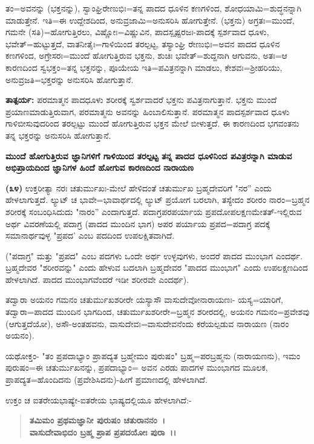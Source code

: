 ತಂ=ಅವನನ್ನು (ಭಕ್ತನನ್ನು), ಸ್ವಾಂಘ್ರಿರೇಣುಭಿಃ=ತನ್ನ ಪಾದದ ಧೂಳಿನ ಕಣಗಳಿಂದ, ಶೋಧಯಾಮಿ=ಶುದ್ಧನನ್ನಾಗಿ ಮಾಡುತ್ತೇನೆ. ಇತಿ=ಈ ಉದ್ದೇಶದಿಂದ, ಅನು\-ವ್ರಜಾಮಿ=\break ಅನುಸರಿಸಿ ಹೋಗುತ್ತೇನೆ. (ಭಕ್ತನು) ಅಗ್ರತಃ=ಮುಂದೆ, ಗಮನೇ (ಸತಿ)=ಹೋಗುತ್ತಿರಲು, ವಿಷ್ಣೋಃ=ವಿಷ್ಣುವಿನ, ಪಾದಸ್ಪೃಷ್ಟರಜಃ-ಪಾದಕ್ಕೆ ಸ್ಪರ್ಶವಾದ ಧೂಳು, ಭವೇತ್=ಹುಟ್ಟುತ್ತದೆ, ವಾತನೀತೈಃ=ಗಾಳಿಯಿಂದ ತರಲ್ಪಟ್ಟ, ತಸ್ಯಾಂಘ್ರಿ ರೇಣುಭಿಃ=ಅವನ ಪಾದದ ಧೂಳಿನ ಕಣಗಳಿಂದ, ಅಗ್ರೇಸರಃ=ಮುಂದೆ ಹೋಗುತ್ತಿರುವ ಭಕ್ತನು, ಶುಚಿಃ ಭವೇತ್=ಶುದ್ದನಾಗಿ ಆಗುವನು, ಅತಃ=ಆ ಕಾರಣದಿಂದ ಸ್ವಭಕ್ತಂ=ತನ್ನ ಭಕ್ತನನ್ನು, ಪೂಯೇಯ ಇತಿ=ಪವಿತ್ರನನ್ನಾಗಿ ಮಾಡಲು, ಕೇಶವಃ=ಶ‍್ರೀಹರಿಯು, ಅನುವ್ರಜತಿ=ಭಕ್ತರನ್ನು ಅನುಸರಿಸಿ ಹೋಗುತ್ತಾನೆ.

\textbf{ತಾತ್ಪರ್ಯ:} ಪರಮಾತ್ಮನ ಪಾದಧೂಳು ಶರೀರಕ್ಕೆ ಸ್ವರ್ಶವಾದರೆ ಭಕ್ತನು ಪವಿತ್ರನಾಗುತ್ತಾನೆ. ಭಕ್ತನು ಮುಂದೆ ಪ್ರಯಾಣಮಾಡುತ್ತಿರುವಾಗ, ಪರಮಾತ್ಮನು ಅವನನ್ನು ಹಿಂಬಾಲಿಸುತ್ತಾನೆ. ಪರಮಾತ್ಮನ ಪಾದಸ್ಪರ್ಶವಾದ ಧೂಳು ಗಾಳಿಬೀಸುವುದರಿಂದ ತರಲ್ಪಟ್ಟು ಮುಂದೆ ಹೋಗುತ್ತಿರುವ ಭಕ್ತನ ಮೇಲೆ ಬೀಳುತ್ತದೆ. ಈ ಕಾರಣದಿಂದ ಭಗವಂತನು ತನ್ನ ಭಕ್ತರನ್ನು ಅನುಸರಿಸಿ ಹೋಗುತ್ತಾನೆ.

\begin{center}
\textbf{ಮುಂದೆ ಹೋಗುತ್ತಿರುವ ಜ್ಞಾನಿಗಳಿಗೆ ಗಾಳಿಯಿಂದ ತರಲ್ಪಟ್ಟ ತನ್ನ ಪಾದದ ಧೂಳಿನಿಂದ ಪವಿತ್ರರನ್ನಾಗಿ ಮಾಡುವ ಅಭಿಪ್ರಾಯದಿಂದ ಜ್ಞಾನಿಗಳ ಹಿಂದೆ ಹೋಗುವ ಕಾರಣದಿಂದ ನಾರಾಯಣ}
\end{center}

\textbf{(೩೪)} ಉಕ್ತರೀತ್ಯಾ ನರಃ ಚತುರ್ಮುಖಃ-ಮೇಲೆ ಹೇಳಿದಂತೆ ಚತುರ್ಮುಖ ಬ್ರಹ್ಮದೇವರಿಗೆ "ನರ'' ಎಂದು ಹೇಳಲಾಗುತ್ತದೆ. ಲ್ಯುಟ್ ಚ ಭಾವೇ=ಭಾವಾರ್ಥದಲ್ಲಿ ಲ್ಯುಟ್ ಪ್ರಯೋಗ ಬರಲಾಗಿ, ತಸ್ಯೇದಂ ಶರೀರಂ ನಾರಂ=ಬ್ರಹ್ಮನ ಶರೀರಕ್ಕೆ ಸಂಬಂಧಿಸಿದುದು "ನಾರಂ'' ಎಂದಾಗುತ್ತದೆ. ಪದಾಗ್ರಪರಪರ್ಯಾಯ ಪ್ರಪದೋಪಲಕ್ಷಣಮೇತತ್-ಇಲ್ಲಿರುವ ಅರ್ಥ ವಿವರಣೆಯಲ್ಲಿ ಪದಾಗ್ರ (ಪಾದದ ಮುಂದಿನ ಭಾಗ) ಅಪರ ಪರ್ಯಾಯ ಪ್ರಪದ=ಪದಾಗ್ರ ಪದಕ್ಕೆ ಸಮಾನಾರ್ಥವುಳ್ಳ "ಪ್ರಪದ' ಎಂಬ ಪದದಿಂದ ಉಪಲಕ್ಷಿತವಾಗಿದೆ.

("ಪದಾಗ್ರ" ಮತ್ತು "ಪ್ರಪದ" ಎಂಬ ಪದಗಳು ಒಂದೇ ಅರ್ಥ ಉಳ್ಳವುಗಳು, ಅಂದರೆ ಪಾದದ ಮುಂಭಾಗ ಎಂದರ್ಥ. ಬ್ರಹ್ಮದೇವರ "ಶರೀರವನ್ನು" ಎಂದು ಹೇಳುವ ಬದಲಾಗಿ ಬ್ರಹ್ಮದೇವರ "ಪಾದದ ಮುಂಭಾಗ" ಎಂದು ಉಪಲಕ್ಷಣದಿಂದ ಹೇಳಲಾಗಿದೆ. ಪಾದದ ಮುಂಭಾಗವೆಂದರೆ ಇಡೀ ಶರೀರವೇ ಎಂದರ್ಥ).

ತದ್ವಾರಾ ಅಯನಂ ಗಮನಂ ಚತುರ್ಮುಖಶರೀರೇ ಯಸ್ಯಾಸೌ ವಾಸುದೇವೋ\break ನಾರಾಯಣಃ- ಯಸ್ಯ=ಯಾರಿಗೆ, ತದ್ವಾರಾ=ಪಾದದ ಮುಂದಿನ ಭಾಗದಿಂದ, ಚತುರ್ಮುಖಶರೀರೇ=ಬ್ರಹ್ಮನ ಶರೀರದಲ್ಲಿ, ಅಯನಂ ಗಮನಂ=ಪ್ರವೇಶವು (ಆಗುತ್ತದೆಯೋ), ಅಸೌ-ಅಂತಹವನು, ವಾಸುದೇವಃ=ವಾಸುದೇವನೆಂದು ಕರೆಯಲ್ಪಡುವ ನಾರಾಯಣ (ನಾರಂ ಅಯನಂ).

ಯಥೋಕ್ತಂ- "ತಂ ಪ್ರಪದಾಭ್ಯಾಂ ಪ್ರಾಪದ್ಯತ ಬ್ರಹ್ಮೇಮಂ ಪುರುಷಂ" ಬ್ರಹ್ಮ=\-ಪರಬ್ರಹ್ಮನು (ನಾರಾಯಣನು), ಇಮಂ ಪುರುಷಂ=ಈ ಚತುರ್ಮುಖನನ್ನು, ಪ್ರಪದಾಭ್ಯಾಂ= ಅವನ ಎರಡು ಪಾದಗಳ ಮುಂಭಾಗದ ಮೂಲಕ, ಪ್ರಾಪದ್ಯತ=ಹೊಂದಿದನು (ಪ್ರವೇಶಿಸಿದನು)-ಹೀಗೆ ಪ್ರಮಾಣದಲ್ಲಿ ಹೇಳಲಾಗಿದೆ.

ಉಕ್ತಂ ಚ ಐತರೇಯಭಾಷ್ಯೇ-ಐತರೇಯ ಭಾಷ್ಯದಲ್ಲಿಯೂ ಹೇಳಲಾಗಿದೆ:-

\begin{verse}
\textbf{ತಮಿಮಂ ಪ್ರಥಮಜ್ಞಾನೀ ಪುರುಷಂ ಚತುರಾನನಂ~।}\\\textbf{ವಾಸುದೇವಾಭಿದಂ ಬ್ರಹ್ಮ ಪ್ರಾಪ ಪ್ರಪದಯೋಃ ಪುರಾ~।।}
\end{verse}

